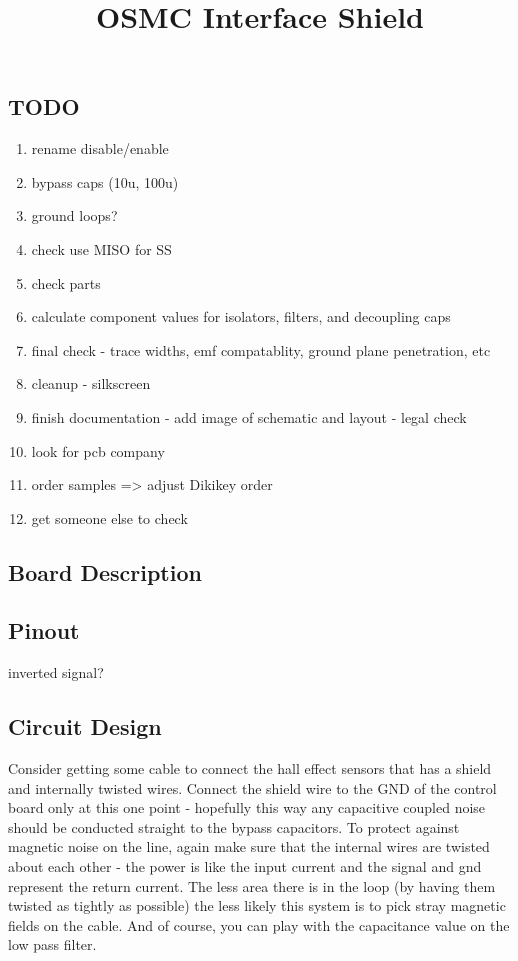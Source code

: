 \documentclass[letterpaper,12pt,notitlepage]{report}
\begin{document}
\title{OSMC Interface Shield}
\author{}
\date{}
\maketitle

\subsection{TODO}
\begin{enumerate}
 \item rename disable/enable
 \item bypass caps (10u, 100u)
 \item ground loops?
 \item check use MISO for SS
 \item check parts
 \item calculate component values for isolators, filters, and decoupling caps
 \item final check - trace widths, emf compatablity, ground plane penetration, etc
 \item cleanup - silkscreen
 \item finish documentation - add image of schematic and layout - legal check
 \item look for pcb company
 \item order samples => adjust Dikikey order
 \item get someone else to check
\end{enumerate}

\subsection{Board Description}

\subsection{Pinout}

inverted signal?

\subsection{Circuit Design}

Consider getting some cable to connect the hall effect sensors that has a shield and internally twisted wires. Connect the shield wire to the GND of the control board only at this one point - hopefully this way any capacitive coupled noise should be conducted straight to the bypass capacitors. To protect against magnetic noise on the line, again make sure that the internal wires are twisted about each other - the power is like the input current and the signal and gnd represent the return current. The less area there is in the loop (by having them twisted as tightly as possible) the less likely this system is to pick stray magnetic fields on the cable. And of course, you can play with the capacitance value on the low pass filter. 
\end{document}
